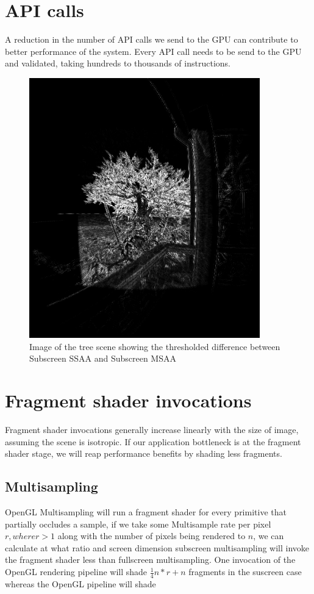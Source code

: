 \documentclass[12pt,a4paper,twoside,openright]{report}
\begin{document}
\section{API calls}

A reduction in the number of API calls we send to the GPU can contribute to better performance of the system. Every API call needs to be send to the GPU and validated, taking hundreds to thousands of instructions.

\begin{figure}[tbh]
\centerline{\includegraphics[width=10cm]{figs/difftree.png}}
\caption{Image of the tree scene showing the thresholded difference between Subscreen SSAA and Subscreen MSAA}
\label{ssaatree}
\end{figure}

\section{Fragment shader invocations}

Fragment shader invocations generally increase linearly with the size of image, assuming the scene is isotropic. If our application bottleneck is at the fragment shader stage, we will reap performance benefits by shading less fragments.

\subsection{Multisampling}
OpenGL Multisampling will run a fragment shader for every primitive that partially occludes a sample, if we take some Multisample rate per pixel $r, where r>1$ along with the number of pixels being rendered to $n$, we can calculate at what ratio and screen dimension subscreen multisampling will invoke the fragment shader less than fullscreen multisampling. One invocation of the OpenGL rendering pipeline will shade $\frac{1}{4}n*r + n$ fragments in the suscreen case whereas the OpenGL pipeline will shade   
\end{document}

